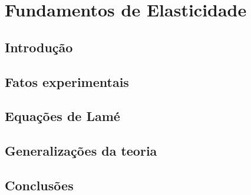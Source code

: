 \chapter{Fundamentos de Elasticidade}\label{sec.fund_elast}

\section{Introdução}

\section{Fatos experimentais}

\section{Equações de Lamé}

\section{Generalizações da teoria}

\section{Conclusões}